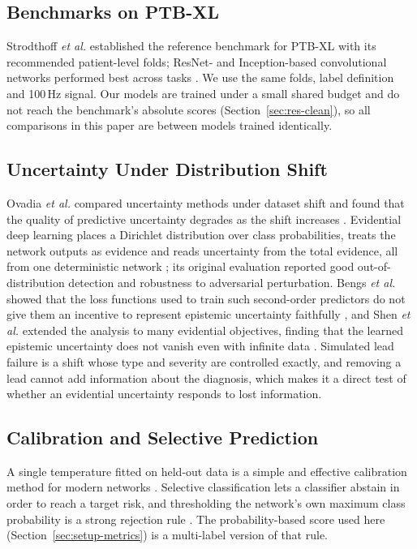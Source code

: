 \subsection{Benchmarks on PTB-XL}
Strodthoff \emph{et al.} established the reference benchmark for PTB-XL with its recommended patient-level folds;
ResNet- and Inception-based convolutional networks performed best across tasks \cite{strodthoff2021benchmark}. We use
the same folds, label definition and 100\,Hz signal. Our models are trained under a small shared budget and do not
reach the benchmark's absolute scores (Section~\ref{sec:res-clean}), so all comparisons in this paper are between
models trained identically.

\subsection{Uncertainty Under Distribution Shift}
Ovadia \emph{et al.} compared uncertainty methods under dataset shift and found that the quality of predictive
uncertainty degrades as the shift increases \cite{ovadia2019trust}. Evidential deep learning places a Dirichlet
distribution over class probabilities, treats the network outputs as evidence and reads uncertainty from the total
evidence, all from one deterministic network \cite{sensoy2018edl}; its original evaluation reported good
out-of-distribution detection and robustness to adversarial perturbation. Bengs \emph{et al.} showed that the loss
functions used to train such second-order predictors do not give them an incentive to represent epistemic
uncertainty faithfully \cite{bengs2022pitfalls}, and Shen \emph{et al.} extended the analysis to many evidential
objectives, finding that the learned epistemic uncertainty does not vanish even with infinite data
\cite{shen2024mirage}. Simulated lead failure is a shift whose type and severity are controlled exactly, and
removing a lead cannot add information about the diagnosis, which makes it a direct test of whether an evidential
uncertainty responds to lost information.

\subsection{Calibration and Selective Prediction}
A single temperature fitted on held-out data is a simple and effective calibration method for modern networks
\cite{guo2017calibration}. Selective classification lets a classifier abstain in order to reach a target risk, and
thresholding the network's own maximum class probability is a strong rejection rule \cite{geifman2017selective}. The
probability-based score used here (Section~\ref{sec:setup-metrics}) is a multi-label version of that rule.
